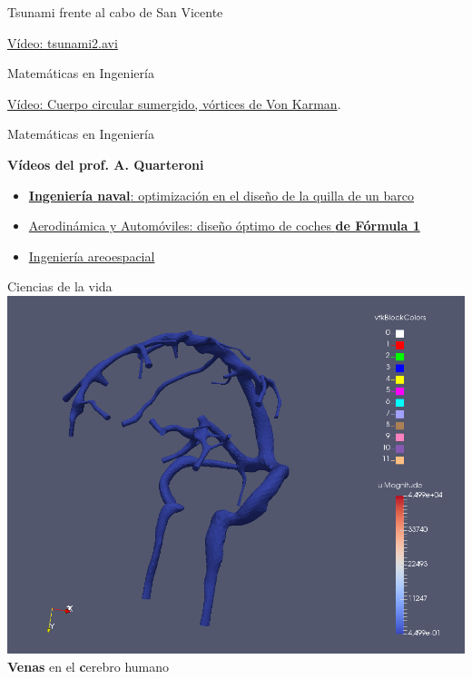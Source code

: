\documentclass[
  unknownkeysallowed %
]{beamer}
\begin{document}
\begin{frame}{Tsunami frente al cabo de San Vicente}
  \par\hfill\scriptsize \href{https://www.youtube.com/watch?v=DkGmz0na00g}{Vídeo: tsunami2.avi}
\end{frame}

\begin{frame}{Matemáticas en Ingeniería}
  \par\hfill\scriptsize \href{https://www.youtube.com/watch?v=E1fPolQ-uTI}{Vídeo: Cuerpo circular sumergido, vórtices de Von Karman}.
\end{frame}

\begin{frame}{Matemáticas en Ingeniería}

  {\large\bf Vídeos del prof. A. Quarteroni}
  \bigskip
  \begin{itemize}\itemsep1em
  \item \href{https://youtu.be/8W4oFOymiyM?t=995}{\textbf{Ingeniería
        naval}: optimización en el diseño de la quilla de un barco}
  \item \href{https://youtu.be/8W4oFOymiyM?t=888}{Aerodinámica y
      Automóviles: diseño óptimo de coches \textbf{de Fórmula 1}}
  \item \href{https://youtu.be/8W4oFOymiyM?t=887}{Ingeniería areoespacial}
  \end{itemize}
\end{frame}


\begin{frame}{Ciencias de la vida}
  \includegraphics[width=0.8\linewidth]{img/brain}
  \\
  \textbf{Venas} en el \alert{\textbf cerebro humano}
\end{frame}
\end{document}
